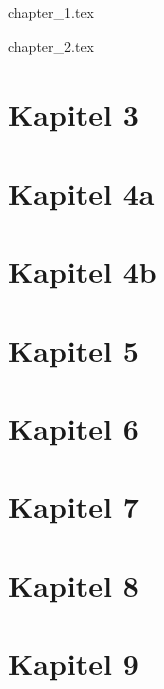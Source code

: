 \documentclass[10pt]{extarticle}
\begin{document}
  \begin{multicols}{2}

    {chapter_1.tex}
    \newpage

    {chapter_2.tex}

    \section*{Kapitel 3}

    \section*{Kapitel 4a}

    \section*{Kapitel 4b}

    \section*{Kapitel 5}

    \section*{Kapitel 6}

    \section*{Kapitel 7}

    \section*{Kapitel 8}

    \section*{Kapitel 9}

  \end{multicols}
\end{document}

